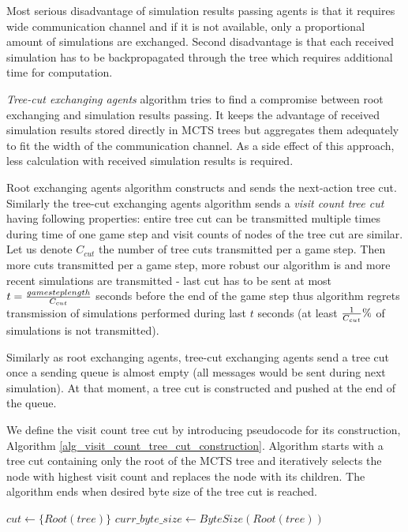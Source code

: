 Most serious disadvantage of simulation results passing agents is that it requires wide
communication channel and if it is not available, only a proportional amount of simulations are
exchanged. Second disadvantage is that each received simulation has to be backpropagated
through the tree which requires additional time for computation.

\emph{Tree-cut exchanging agents} algorithm tries to find a compromise between root exchanging 
and simulation results passing. It keeps the advantage of received simulation results stored
directly in MCTS trees but aggregates them adequately to fit the width of the communication
channel. As a side effect of this approach, less calculation with received simulation results
is required.


Root exchanging agents algorithm constructs and sends the next-action tree cut. Similarly the
tree-cut exchanging agents algorithm sends a \emph{visit count tree cut} having following
properties: entire tree cut can be transmitted multiple times during time of one game step and 
visit counts of nodes of the tree cut are similar. Let us denote $C_{cut}$ the number of tree
cuts transmitted per a game step. Then more cuts transmitted per a game step, more
robust our algorithm is and more recent simulations are transmitted - last cut has to be sent
at most $t = {game step length \over C_{cut}}$ seconds before the end of the game step thus 
algorithm regrets transmission of
simulations performed during last $t$ seconds (at least ${ 1 \over C_{cut} }\%$ of simulations
is not transmitted).

Similarly as root exchanging agents, tree-cut exchanging agents send a tree cut once a sending
queue is almost empty (all messages would be sent during next simulation). At that moment, a
tree cut is constructed and pushed at the end of the queue.

We define the visit count tree cut by introducing pseudocode for its construction, Algorithm
\ref{alg_visit_count_tree_cut_construction}. Algorithm starts with a tree cut containing only
the root of the MCTS tree and iteratively selects the node with highest visit count and
replaces the node with its children. The algorithm ends when desired byte size of the tree cut
is reached.

\begin{algorithm}
\DontPrintSemicolon
\caption{$BuildVisitCountTreeCut(tree,byte\_size)$\label{alg_visit_count_tree_cut_construction}}
$cut \leftarrow \{Root(tree)\}$ \;
$curr\_byte\_size \leftarrow ByteSize(Root(tree))$\;
\end{algorithm}

